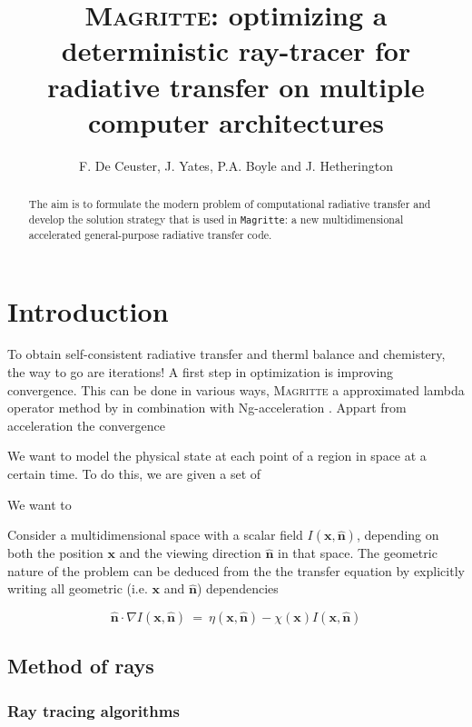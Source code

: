 \documentclass[]{article}
\title{\textsc{Magritte}: optimizing a deterministic ray-tracer for radiative transfer on multiple computer architectures}
\author{F. De Ceuster, J. Yates, P.A. Boyle and J. Hetherington}
\date{}
\newcommand{\x}{\textbf{x}}
\newcommand{\n}{\hat{\textbf{n}}}
\newcommand{\e}{ \ = \ }
\newcommand{\Magritte}{\texttt{Magritte}}
\begin{document}
\maketitle


\begin{abstract}
The aim is to formulate the modern problem of computational radiative transfer and develop the solution strategy that is used in \Magritte: a new multidimensional accelerated general-purpose radiative transfer code.
\end{abstract}



\section{Introduction}

To obtain self-consistent radiative transfer and therml balance and chemistery, the way to go are iterations!
A first step in optimization is improving convergence. This can be done in various ways, \textsc{Magritte} a approximated lambda operator method by \cite{Rybicki1991} in combination with Ng-acceleration \cite{Ng1974}.
Appart from acceleration the convergence


We want to model the physical state at each point of a region in space at a certain time. To do this, we are given a set of

\bigskip

We want to

\bigskip

Consider a multidimensional space with a scalar field $I(\x,\n)$, depending on both the position $\x$ and the viewing direction $\n$ in that space. The geometric nature of the problem can be deduced from the the transfer equation by explicitly writing all geometric (i.e. $\x$ and $\n$) dependencies


\begin{equation}
\n \cdot \nabla I(\x,\n) \e \eta(\x,\n) - \chi(\x) I(\x,\n)
\end{equation}


\subsection{Method of rays}

\subsubsection{Ray tracing algorithms}
\end{document}

